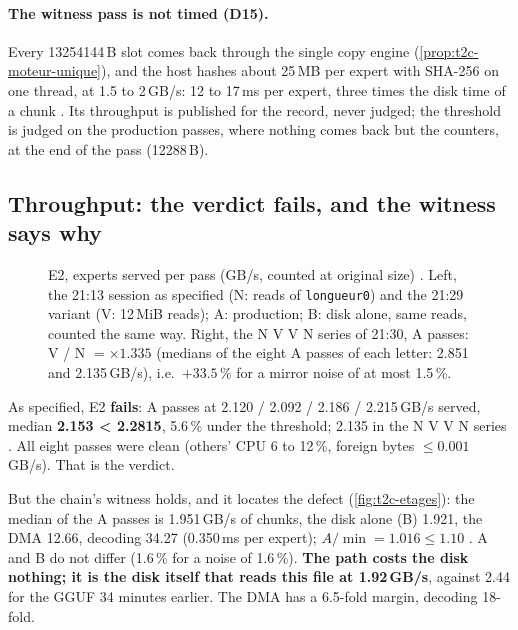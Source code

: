 \paragraph{The witness pass is not timed (D15).} Every \num{13254144}\,B slot comes back through the single copy engine (\cref{prop:t2c-moteur-unique}), and the host hashes about 25\,MB per expert with SHA-256 on one thread, at 1.5 to 2\,GB/s: 12 to 17\,ms per expert, three times the disk time of a chunk \calc. Its throughput is published for the record, never judged; the threshold is judged on the production passes, where nothing comes back but the counters, at the end of the pass (\num{12288}\,B).

\subsection{Throughput: the verdict fails, and the witness says why}

\begin{figure}[ht]
\centering
\GrapheChmEdeux
\caption[E2: experts served per pass]{E2, experts served per pass (GB/s, counted at original size) \mes. Left, the 21:13 session as specified (N: reads of \texttt{longueur0}) and the 21:29 variant (V: 12\,MiB reads); A: production; B: disk alone, same reads, counted the same way. Right, the N V V N series of 21:30, A passes: V / N $= \times 1.335$ (medians of the eight A passes of each letter: 2.851 and 2.135\,GB/s), i.e.\ $+33.5\,\%$ for a mirror noise of at most 1.5\,\%.}
\label{fig:t2c-e2}
\end{figure}

As specified, E2 \textbf{fails}: A passes at 2.120 / 2.092 / 2.186 / 2.215\,GB/s served, median \textbf{2.153 < 2.2815}, 5.6\,\% under the threshold; 2.135 in the N V V N series \mes. All eight passes were clean (others' CPU 6 to 12\,\%, foreign bytes $\le 0.001$\,GB/s). That is the verdict.

But the chain's witness holds, and it locates the defect (\cref{fig:t2c-etages}): the median of the A passes is 1.951\,GB/s of chunks, the disk alone (B) 1.921, the DMA 12.66, decoding 34.27 (0.350\,ms per expert); $A/\min = 1.016 \le 1.10$ \mes. A and B do not differ (1.6\,\% for a noise of 1.6\,\%). \textbf{The path costs the disk nothing; it is the disk itself that reads this file at 1.92\,GB/s}, against 2.44 for the GGUF 34 minutes earlier. The DMA has a 6.5-fold margin, decoding 18-fold.

